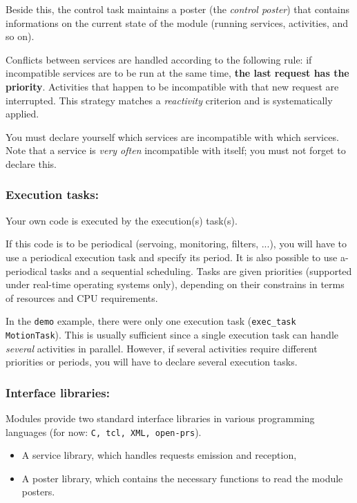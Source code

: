 Beside    this, the control task  maintains   a poster  (the \emph{control
poster}) that contains informations on   the current state of the  module
(running services, activities, and so on).

Conflicts between services are   handled  according to the following  rule:  if
incompatible  services are to  be run  at the  same  time, \textbf{the last
request   has  the  priority}. Activities    that  happen to  be
incompatible  with that new request are  interrupted. This strategy matches a
\emph{reactivity} criterion and is systematically applied.

You must  declare  yourself which  services  are incompatible with  which
services. Note that   a service is  \emph{very often}  incompatible  with
itself; you must not forget to declare this.


\subsubsection{Execution tasks:}

Your own code is executed by the execution(s) task(s).

If  this code is to  be periodical (servoing,  monitoring, filters, ...),
you will have to use a periodical  execution task and specify its period.
It   is  also  possible   to use   a-periodical  tasks  and  a  sequential
scheduling. Tasks are  given priorities (supported under real-time
operating systems only),
depending on their constrains in terms of resources and CPU requirements.

In the  \texttt{demo} example,  there were  only one  execution  task 
(\texttt{exec\_task MotionTask}). 
This   is  usually  sufficient since  a   single
execution task can handle \emph{several}  activities in parallel. However,
if several  activities require different  priorities or periods, you will
have to declare several execution tasks.


\subsubsection{Interface libraries:}

Modules provide two standard interface libraries in various programming
languages (for now: \texttt{C, tcl, XML, open-prs}).

\begin{itemize}
\item A service library, which handles requests emission and reception,
\item A poster library, which contains the necessary functions to read
the module posters.
\end{itemize}


